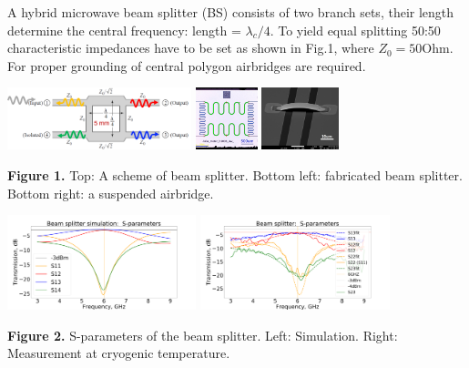 \documentclass[a0paper,portrait]{baposter}
\begin{document}
\begin{poster}
{\small{A hybrid microwave beam splitter (BS) consists of two branch sets, their length determine the central frequency: length = $\lambda_c/4$. To yield equal splitting 50:50 characteristic impedances have to be set as shown in Fig.1, where $Z_0=50$Ohm. For proper grounding of central polygon airbridges\cite{chen2014fabrication} are required. }
\begin{center}
\includegraphics [height=18mm]{figures/scheme.png}
\includegraphics [height=18mm] {figures/colour2.png}
\includegraphics [height=18mm] {figures/bridge.jpg}
\end{center}
\small{\textbf{Figure 1.} Top: A scheme of beam splitter. Bottom left: fabricated beam splitter. Bottom right: a suspended airbridge.}
\begin{center}
\includegraphics [height=27.5mm]{figures/simul1.png}
\includegraphics [height=27.5mm] {figures/4_2.png}
\end{center}
\small{\textbf{Figure 2.} S-parameters of the beam splitter. Left: Simulation. Right: Measurement at cryogenic temperature.}

}


\end{poster}
\end{document}
